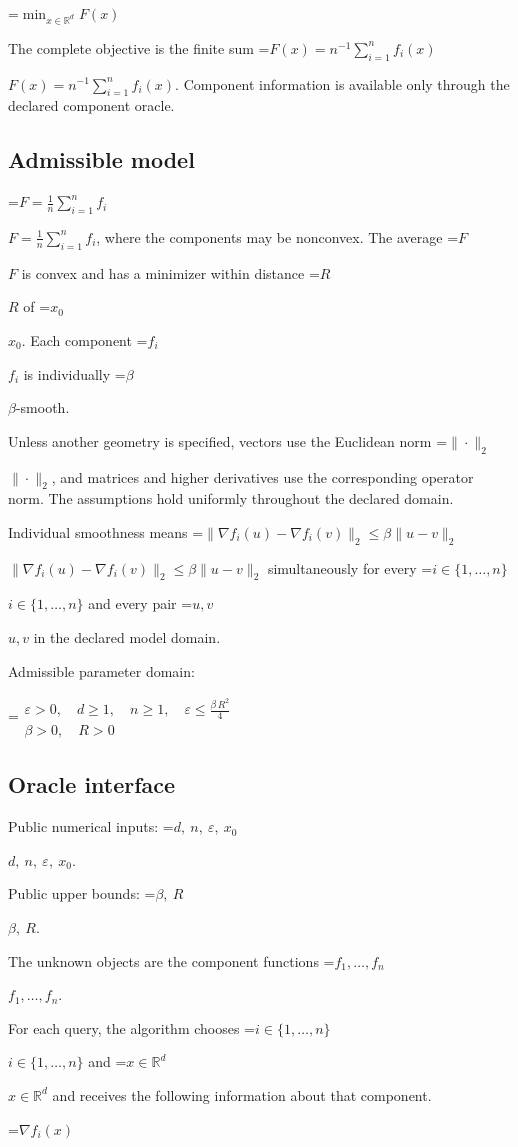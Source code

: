 \documentclass[10pt,a4paper]{article}
\newcommand{\AtlasMath}[1]{\par\begingroup\centering\setbox0=\hbox{$\displaystyle #1$}\ifdim\wd0>1.4\linewidth\typeout{ATLAS WIDE FORMULA: \the\wd0}\fi\ifdim\wd0>\linewidth\resizebox{\linewidth}{!}{\box0}\else\box0\fi\par\endgroup}
\newcommand{\AtlasInlineMath}[1]{\begingroup\setbox0=\hbox{$#1$}\ifdim\wd0>.4\linewidth\endgroup\AtlasMath{#1}\else\endgroup$#1$\fi}
\begin{document}
\AtlasMath{\min_{x\in \mathbb{R}^d}F(x)}


The complete objective is the finite sum \AtlasInlineMath{F(x)=n^{-1}\sum_{i=1}^n f_i(x)}. Component information is available only through the declared component oracle.

\subsection{Admissible model}
\AtlasInlineMath{F=\frac1n\sum_{i=1}^n f_i}, where the components may be nonconvex. The average \AtlasInlineMath{F} is convex and has a minimizer within distance \AtlasInlineMath{R} of \AtlasInlineMath{x_0}. Each component \AtlasInlineMath{f_i} is individually \AtlasInlineMath{\beta}-smooth.

Unless another geometry is specified, vectors use the Euclidean norm \AtlasInlineMath{\|\cdot\|_2}, and matrices and higher derivatives use the corresponding operator norm. The assumptions hold uniformly throughout the declared domain.

Individual smoothness means \AtlasInlineMath{\|\nabla f_i(u)-\nabla f_i(v)\|_2\le\beta\|u-v\|_2} simultaneously for every \AtlasInlineMath{i\in\{1,\ldots,n\}} and every pair \AtlasInlineMath{u,v} in the declared model domain.

Admissible parameter domain:


\AtlasMath{\begin{gathered}\varepsilon > 0,\quad d \ge 1,\quad n \ge 1,\quad \varepsilon \le \frac{\beta\,{R}^{2}}{4}\\\beta > 0,\quad R > 0\end{gathered}}


\subsection{Oracle interface}
Public numerical inputs: \AtlasInlineMath{d,\ n,\ \varepsilon,\ x_0}.

Public upper bounds: \AtlasInlineMath{\beta,\ R}.

The unknown objects are the component functions \AtlasInlineMath{f_1,\ldots,f_n}.

For each query, the algorithm chooses \AtlasInlineMath{i\in\{1,\ldots,n\}} and \AtlasInlineMath{x\in\mathbb R^d} and receives the following information about that component.


\AtlasMath{\nabla f_i(x)}
\end{document}

